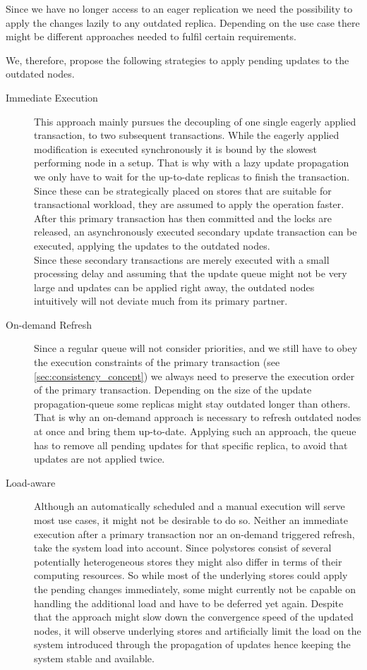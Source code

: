 Since we have no longer access to an eager replication we need the possibility to apply the changes lazily to any outdated replica.
Depending on the use case there might be different approaches needed to fulfil certain requirements.

We, therefore, propose the following strategies to apply pending updates to the outdated nodes.

\begin{description}
    \item[Immediate Execution] This approach mainly pursues the decoupling of one single eagerly applied transaction, to two subsequent transactions.
    While the eagerly applied modification is executed synchronously it is bound by the slowest performing node in a setup.
    That is why with a lazy update propagation we only have to wait for the up-to-date replicas to finish the transaction.
    Since these can be strategically placed on stores that are suitable for transactional workload, they are assumed to apply the operation faster.
    After this primary transaction has then committed and the locks are released, an asynchronously executed secondary update transaction can be executed, 
    applying the updates to the outdated nodes.\\
    Since these secondary transactions are merely executed with a small processing delay and assuming that the update queue might not be very large and 
    updates can be applied right away, the outdated nodes intuitively will not deviate much from its primary partner.

    \item[On-demand Refresh] Since a regular queue will not consider priorities, and we still have to obey the execution constraints of the primary transaction (see \ref{sec:consistency_concept})
    we always need to preserve the execution order of the primary transaction. Depending on the size of the update propagation-queue some replicas might stay outdated longer than others.
    That is why an on-demand approach is necessary to refresh outdated nodes at once and bring them up-to-date.
    Applying such an approach, the queue has to remove all pending updates for that specific replica, to avoid that updates are not applied twice. 
    
    \item[Load-aware] Although an automatically scheduled and a manual execution will serve most use cases, it might not be desirable to do so.
    Neither an immediate execution after a primary transaction nor an on-demand triggered refresh, take the system load into account.
    Since polystores consist of several potentially heterogeneous stores they might also differ in terms of their computing resources.
    So while most of the underlying stores could apply the pending changes immediately, some might currently not be capable on handling the additional load and have to 
    be deferred yet again. Despite that the approach might slow down the convergence speed of the updated nodes, 
    it will observe underlying stores and artificially limit the load on the system introduced through the propagation of updates hence keeping the system stable and available.


\end{description}
